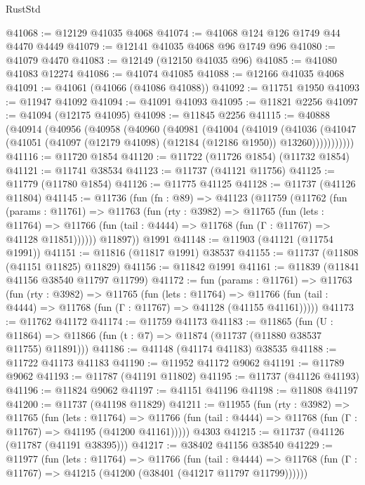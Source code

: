 \begin{lexlean}{RustStd}
\begin{coremodule}
@41068 := @12129 @41035 @4068
@41074 := @41068 @124 @126 @1749 @44 @4470 @4449
@41079 := @12141 @41035 @4068 @96 @1749 @96
@41080 := @41079 @4470
@41083 := @12149 (@12150 @41035 @96)
@41085 := @41080 @41083 @12274
@41086 := @41074 @41085
@41088 := @12166 @41035 @4068
@41091 := @41061 (@41066 (@41086 @41088))
@41092 := @11751 @1950
@41093 := @11947 @41092
@41094 := @41091 @41093
@41095 := @11821 @2256
@41097 := @41094 (@12175 @41095)
@41098 := @11845 @2256
@41115 := @40888
    (@40914
      (@40956
        (@40958
          (@40960
            (@40981
              (@41004
                (@41019
                  (@41036
                    (@41047
                      (@41051 (@41097 (@12179 @41098) (@12184 (@12186 @1950)) @13260)))))))))))
@41116 := @11720 @1854
@41120 := @11722 (@11726 @1854) (@11732 @1854)
@41121 := @11741 @38534
@41123 := @11737 (@41121 @11756)
@41125 := @11779 (@11780 @1854)
@41126 := @11775 @41125
@41128 := @11737 (@41126 @11804)
@41145 := @11736
    (fun (fn : @89) =>
    @41123
      (@11759
        (@11762
          (fun (params : @11761) =>
          @11763
            (fun (rty : @3982) =>
            @11765
              (fun (lets : @11764) =>
              @11766 (fun (tail : @4444) => @11768 (fun (Γ : @11767) => @41128 @11851))))))
        @11897))
    @1991
@41148 := @11903 (@41121 (@11754 @1991))
@41151 := @11816 (@11817 @1991) @38537
@41155 := @11737 (@11808 (@41151 @11825) @11829)
@41156 := @11842 @1991
@41161 := @11839 (@11841 @41156 @38540 @11797 @11799)
@41172 := fun (params : @11761) =>
  @11763
    (fun (rty : @3982) =>
    @11765
      (fun (lets : @11764) =>
      @11766 (fun (tail : @4444) => @11768 (fun (Γ : @11767) => @41128 (@41155 @41161)))))
@41173 := @11762 @41172
@41174 := @11759 @41173
@41183 := @11865
    (fun (U : @11864) => @11866 (fun (t : @7) => @11874 (@11737 (@11880 @38537 @11755) @11891)))
@41186 := @41148 (@41174 @41183) @38535
@41188 := @11722 @41173 @41183
@41190 := @11952 @41172 @9062
@41191 := @11789 @9062
@41193 := @11787 (@41191 @11802)
@41195 := @11737 (@41126 @41193)
@41196 := @11824 @9062
@41197 := @41151 @41196
@41198 := @11808 @41197
@41200 := @11737 (@41198 @11829)
@41211 := @11955
    (fun (rty : @3982) =>
    @11765
      (fun (lets : @11764) =>
      @11766 (fun (tail : @4444) => @11768 (fun (Γ : @11767) => @41195 (@41200 @41161)))))
    @4303
@41215 := @11737 (@41126 (@11787 (@41191 @38395)))
@41217 := @38402 @41156 @38540
@41229 := @11977
    (fun (lets : @11764) =>
    @11766
      (fun (tail : @4444) =>
      @11768 (fun (Γ : @11767) => @41215 (@41200 (@38401 (@41217 @11797 @11799))))))

\end{coremodule}
\end{lexlean}
